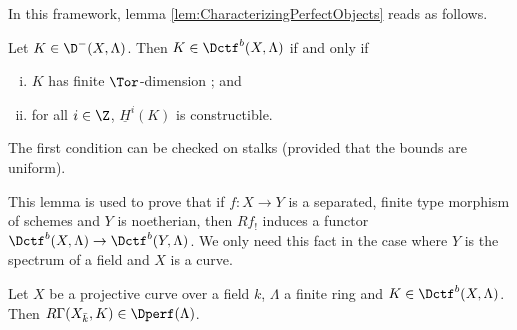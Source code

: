 In this framework, lemma \ref{lem:CharacterizingPerfectObjects} reads as follows.

\begin{lem} 
Let $K\in \D^-(X, \Lambda)$. Then $K\in \Dctf^b(X, \Lambda)$ if and only if 
\begin{enumerate}[i.]
\item
$K$ has finite $\Tor$-dimension ; and
\item
for all $i \in \Z$, $\underline{H}^i(K)$ is constructible.
\end{enumerate} 
\end{lem}

The first condition can be checked on stalks (provided that the bounds are uniform).

\begin{remark} 
This lemma is used to prove that if $f: X\to Y$ is a separated, finite type morphism of schemes and $Y$ is noetherian, then $Rf_!$ induces a functor $\Dctf^b(X, \Lambda) \to \Dctf^b (Y, \Lambda)$. We only need this fact in the case where $Y$ is the spectrum of a field and $X$ is a curve. 
\end{remark}

\begin{prop}
Let $X$ be a projective curve over a field $k$, $\Lambda$ a finite ring and $K\in \Dctf^b (X, \Lambda)$. Then $R\Gamma(X_{\bar k}, K)\in \Dperf(\Lambda)$.
\end{prop}
	
